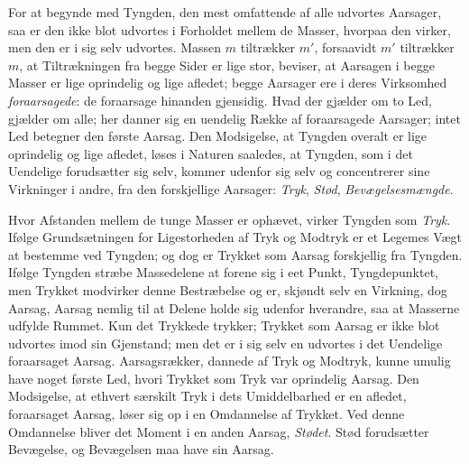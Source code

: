 \documentclass[12pt,a4paper]{book}
\begin{document}
For at begynde med Tyngden, den mest omfattende af alle udvortes
Aarsager, saa er den ikke blot udvortes i Forholdet mellem de Masser,
hvorpaa den virker, men den er i sig selv udvortes. Massen $m$ tiltrækker
$m'$, forsaavidt $m'$ tiltrækker $m$, at Tiltrækningen fra begge Sider er
lige stor, beviser, at Aarsagen i begge Masser er lige oprindelig og lige
afledet; begge Aarsager ere i deres Virksomhed \emph{foraarsagede}: de
foraarsage hinanden gjensidig. Hvad der gjælder om to Led, gjælder om
alle; her danner sig en uendelig Række af foraarsagede Aarsager; intet
Led betegner den første Aarsag. Den Modsigelse, at Tyngden overalt er
lige oprindelig og lige afledet, løses i Naturen saaledes, at Tyngden,
som i det Uendelige forudsætter sig selv, kommer udenfor sig selv og
concentrerer sine Virkninger i andre, fra den forskjellige Aarsager:
\emph{Tryk}, \emph{Stød}, \emph{Bevægelsesmængde}.

Hvor Afstanden mellem de tunge Masser er ophævet, virker Tyngden som
\emph{Tryk}. Ifølge Grundsætningen for Ligestorheden af Tryk og Modtryk
er et Legemes Vægt at bestemme ved Tyngden; og dog er Trykket som Aarsag
forskjellig fra Tyngden. Ifølge Tyngden stræbe Massedelene at forene sig
i eet Punkt, Tyngdepunktet, men Trykket modvirker denne Bestræbelse og
er, skjøndt selv en Virkning, dog Aarsag, Aarsag nemlig til at Delene
holde sig udenfor hverandre, saa at Masserne udfylde Rummet. Kun det
Trykkede trykker; Trykket som Aarsag er ikke blot udvortes imod sin
Gjenstand; men det er i sig selv en udvortes i det Uendelige foraarsaget
Aarsag. Aarsagsrækker, dannede af Tryk og Modtryk, kunne umulig have
noget første Led, hvori Trykket som Tryk var oprindelig Aarsag. Den
Modsigelse, at ethvert særskilt Tryk i dets Umiddelbarhed er en afledet,
foraarsaget Aarsag, løser sig op i en Omdannelse af Trykket. Ved denne
Omdannelse bliver det Moment i en
anden Aarsag, \emph{Stødet}. Stød forudsætter Bevægelse, og Bevægelsen
maa have sin Aarsag.
\end{document}
